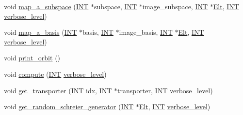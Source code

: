 \begin{DoxyCompactItemize}
\item 
void \mbox{\hyperlink{classorbit__of__subspaces_a2aa8610550666ef263bf0a0e21e37eba}{map\+\_\+a\+\_\+subspace}} (\mbox{\hyperlink{galois_8h_a09fddde158a3a20bd2dcadb609de11dc}{I\+NT}} $\ast$subspace, \mbox{\hyperlink{galois_8h_a09fddde158a3a20bd2dcadb609de11dc}{I\+NT}} $\ast$image\+\_\+subspace, \mbox{\hyperlink{galois_8h_a09fddde158a3a20bd2dcadb609de11dc}{I\+NT}} $\ast$\mbox{\hyperlink{simeon_8_c_aec1406935bdb1fee3561fcb840964100}{Elt}}, \mbox{\hyperlink{galois_8h_a09fddde158a3a20bd2dcadb609de11dc}{I\+NT}} \mbox{\hyperlink{simeon_8_c_a818073fbcc2f439e7c56952f67386122}{verbose\+\_\+level}})
\item 
void \mbox{\hyperlink{classorbit__of__subspaces_addbdc7a355fbd5b5a220bdbc2023b64b}{map\+\_\+a\+\_\+basis}} (\mbox{\hyperlink{galois_8h_a09fddde158a3a20bd2dcadb609de11dc}{I\+NT}} $\ast$basis, \mbox{\hyperlink{galois_8h_a09fddde158a3a20bd2dcadb609de11dc}{I\+NT}} $\ast$image\+\_\+basis, \mbox{\hyperlink{galois_8h_a09fddde158a3a20bd2dcadb609de11dc}{I\+NT}} $\ast$\mbox{\hyperlink{simeon_8_c_aec1406935bdb1fee3561fcb840964100}{Elt}}, \mbox{\hyperlink{galois_8h_a09fddde158a3a20bd2dcadb609de11dc}{I\+NT}} \mbox{\hyperlink{simeon_8_c_a818073fbcc2f439e7c56952f67386122}{verbose\+\_\+level}})
\item 
void \mbox{\hyperlink{classorbit__of__subspaces_ab50f480e950d276898adbb081dde10bc}{print\+\_\+orbit}} ()
\item 
void \mbox{\hyperlink{classorbit__of__subspaces_a4db831667990a71f13394c7c4d83b6e6}{compute}} (\mbox{\hyperlink{galois_8h_a09fddde158a3a20bd2dcadb609de11dc}{I\+NT}} \mbox{\hyperlink{simeon_8_c_a818073fbcc2f439e7c56952f67386122}{verbose\+\_\+level}})
\item 
void \mbox{\hyperlink{classorbit__of__subspaces_a8a12bc95bd872bc86e026ea09b9dd396}{get\+\_\+transporter}} (\mbox{\hyperlink{galois_8h_a09fddde158a3a20bd2dcadb609de11dc}{I\+NT}} idx, \mbox{\hyperlink{galois_8h_a09fddde158a3a20bd2dcadb609de11dc}{I\+NT}} $\ast$transporter, \mbox{\hyperlink{galois_8h_a09fddde158a3a20bd2dcadb609de11dc}{I\+NT}} \mbox{\hyperlink{simeon_8_c_a818073fbcc2f439e7c56952f67386122}{verbose\+\_\+level}})
\item 
void \mbox{\hyperlink{classorbit__of__subspaces_a3515f558abf49f6d5433709a9f83fd9f}{get\+\_\+random\+\_\+schreier\+\_\+generator}} (\mbox{\hyperlink{galois_8h_a09fddde158a3a20bd2dcadb609de11dc}{I\+NT}} $\ast$\mbox{\hyperlink{simeon_8_c_aec1406935bdb1fee3561fcb840964100}{Elt}}, \mbox{\hyperlink{galois_8h_a09fddde158a3a20bd2dcadb609de11dc}{I\+NT}} \mbox{\hyperlink{simeon_8_c_a818073fbcc2f439e7c56952f67386122}{verbose\+\_\+level}})

\end{DoxyCompactItemize}
